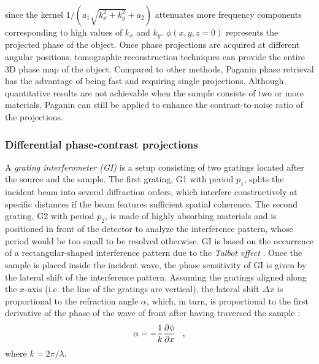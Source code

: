 {since the kernel $1/\left(a_{1}\sqrt{k_{x}^{2}+k_{y}^{2}} + a_{2}\right)$ attenuates more frequency components corresponding to
high values of $k_{x}$ and $k_{y}$.
\newline
$\phi(x,y,z=0)$ represents the projected phase of the object. Once phase projections are acquired at different angular positions,
tomographic reconstruction techniques can provide the entire 3D phase map of the object. 
\newline
Compared to other methods, Paganin phase retrieval has the advantage of being fast and requiring single projections. Although quantitative results
are not achievable when the sample consists of two or more materials, Paganin can still be applied to enhance the contrast-to-noise ratio of the projections.


\subsubsection{Differential phase-contrast projections}
\label{introduction:phase-contrast-imaging:differential-phase-contrast-projections}
A \emph{grating interferometer (GI)} \cite{David2002,Momose2003} is a setup consisting of two gratings located after the source and the sample.
The first grating, G1 with period $p_{1}$, splits the incident beam into several diffraction orders, which interfere
constructively at specific distances if the beam features sufficient spatial coherence. 
The second grating, G2 with period $p_{2}$, is made of highly absorbing materials and is positioned in front of the detector
to analyze the interference pattern, whose period would be too small to be resolved otherwise.
\newline
GI is based on the occurrence of a rectangular-shaped interference pattern due to the \emph{Talbot effect} \cite{Talbot1836}.
Once the sample is placed inside the incident wave, the phase sensitivity of GI is given by the lateral shift of the interference pattern.
Assuming the gratings aligned along the $x$-axis (i.e. the line of the gratings are vertical), the lateral shift $\Delta x$ is proportional to the refraction angle $\alpha$, which, in turn, is proportional to the first derivative
of the phase of the wave of front after having traversed the sample \cite{Born1999,Modregger2012}:
\begin{equation}
  \alpha = -\frac{1}{k}\frac{\partial \phi}{\partial x} \hspace{0.3cm},
  \label{gi_dpc_1}
\end{equation}
where $k = 2\pi/\lambda$.
}
